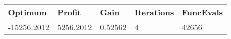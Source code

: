 \begin{tabular}{lllll}
Optimum & Profit & Gain & Iterations & FuncEvals \\ 
\hline 
-15256.2012 & 5256.2012 & 0.52562 & 4 & 42656 \\ 
\hline 
\end{tabular}